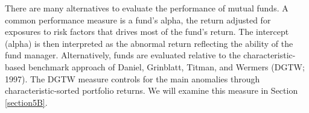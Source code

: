 \label{section4}


There are many alternatives to evaluate the performance of mutual funds. A common performance measure is a fund's alpha, the return adjusted for exposures to risk factors that drives most of the fund's return. The intercept (alpha) is then interpreted as the abnormal return reflecting the ability of the fund manager. Alternatively, funds are evaluated relative to the characteristic-based benchmark approach of Daniel, Grinblatt, Titman, and Wermers (DGTW; 1997). The DGTW measure controls for the main anomalies through characteristic-sorted portfolio returns. We will examine this measure in Section \ref{section5B}. 


